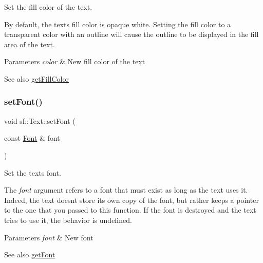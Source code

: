 Set the fill color of the text. 

By default, the text\textquotesingle{}s fill color is opaque white. Setting the fill color to a transparent color with an outline will cause the outline to be displayed in the fill area of the text.


\begin{DoxyParams}{Parameters}
{\em color} & New fill color of the text\\
\hline
\end{DoxyParams}
\begin{DoxySeeAlso}{See also}
\mbox{\hyperlink{classsf_1_1_text_a6b4ba8c435b59e1e05f831e6230dc537}{get\+Fill\+Color}} \begin{DoxyVerb}\end{DoxyVerb}
 
\end{DoxySeeAlso}
\mbox{\label{classsf_1_1_text_a2927805d1ae92d57f15034ea34756b81}} 
\subsubsection{\texorpdfstring{setFont()}{setFont()}}
{\footnotesize\ttfamily void sf\+::\+Text\+::set\+Font (\begin{DoxyParamCaption}\item[{const \mbox{\hyperlink{classsf_1_1_font}{Font}} \&}]{font }\end{DoxyParamCaption})}



Set the text\textquotesingle{}s font. 

The {\itshape font} argument refers to a font that must exist as long as the text uses it. Indeed, the text doesn\textquotesingle{}t store its own copy of the font, but rather keeps a pointer to the one that you passed to this function. If the font is destroyed and the text tries to use it, the behavior is undefined.


\begin{DoxyParams}{Parameters}
{\em font} & New font\\
\hline
\end{DoxyParams}
\begin{DoxySeeAlso}{See also}
\mbox{\hyperlink{classsf_1_1_text_a47cd96d7b2c37b2f820e4d6e1bb83f96}{get\+Font}} \begin{DoxyVerb}\end{DoxyVerb}
 
\end{DoxySeeAlso}
\mbox{\label{classsf_1_1_text_ab516110605edb0191a7873138ac42af2}} 
